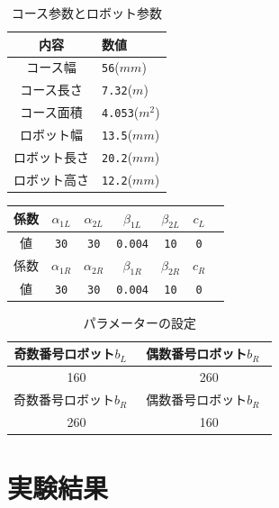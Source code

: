 \documentclass[twocolumn]{jarticle} %
\begin{document}
\begin{table}[!htb]
\begin{center}
\begin{tabular}{|cl|}
\hline
内容 &  数値\\
\hline
コース幅 & \verb|56|($mm$) \\
コース長さ & \verb|7.32|($m$) \\
コース面積 & \verb|4.053|($m^2$) \\
ロボット幅 & \verb|13.5|($mm$) \\
ロボット長さ & \verb|20.2|($mm$) \\
ロボット高さ & \verb|12.2|($mm$) \\
\hline
\end{tabular}
\end{center}
\caption{
コース参数とロボット参数
}
\end{table}


\begin{table}[!htb]
\begin{center}
\begin{tabular}{|c|c|c|c|c|c|c|}
\hline
係数 & $\alpha_{1L}$ & $\alpha_{2L}$ & $\beta_{1L}$ & $\beta_{2L}$ & $c_L$ \\
\hline
値 & \verb|30| & \verb|30| & \verb|0.004| & \verb|10| & \verb|0| \\
\hline
係数 & $\alpha_{1R}$ & $\alpha_{2R}$ & $\beta_{1R}$ & $\beta_{2R}$ & $c_R$ \\
\hline
値 & \verb|30|& \verb|30| & \verb|0.004| & \verb|10| & \verb|0| \\
\hline
\end{tabular}
\end{center}
\end{table}

\begin{table}[!htb]
\begin{center}
\begin{tabular}{|c|c|}
\hline
 奇数番号ロボット$b_L$ & 偶数番号ロボット$b_R$　\\
\hline
　160　&　260　\\
\hline
 奇数番号ロボット$b_R$ & 偶数番号ロボット$b_R$　\\
\hline
　260　&　160　\\
\hline
\end{tabular}
\end{center}
\caption{
パラメーターの設定
}
\end{table}


\section{実験結果}
\end{document}

